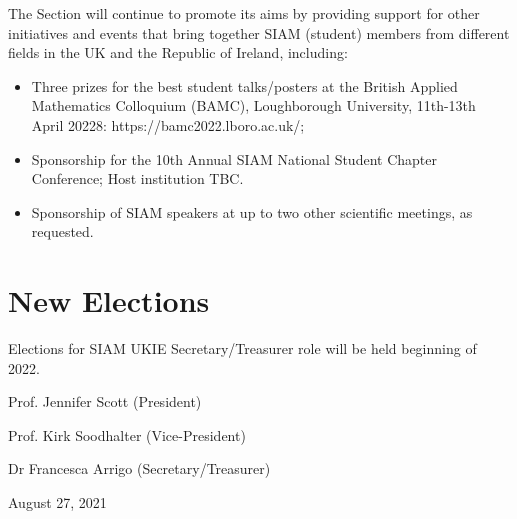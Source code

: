 \documentclass{article}
\begin{document}
The Section will continue to promote its aims by providing support for other initiatives and events
that bring together SIAM (student) members from different fields in the UK and the Republic of
Ireland, including:
\begin{itemize}
    \item Three prizes for the best student talks/posters at the British Applied Mathematics Colloquium (BAMC),  Loughborough University,  11th-13th April 20228: https://bamc2022.lboro.ac.uk/;
\item Sponsorship for the 10th Annual SIAM National Student Chapter Conference; Host institution TBC.
\item Sponsorship of SIAM speakers at up to two other scientific meetings, as requested.
\end{itemize}

\section*{New Elections}
Elections for SIAM UKIE Secretary/Treasurer role will be held beginning of 2022.


\vspace{3cm}

\hfill Prof. Jennifer Scott (President)

\hfill Prof. Kirk Soodhalter (Vice-President)

\hfill Dr Francesca Arrigo (Secretary/Treasurer)

\bigskip

\hfill August 27, 2021
\end{document}
